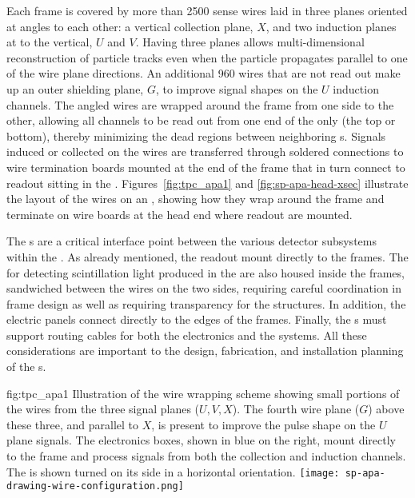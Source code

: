 Each  frame is covered by more than \num{2500} sense wires laid in three planes  oriented at angles to each other: a vertical collection plane, $X$, and two induction planes at \apainducwireangle to the vertical, $U$ and $V$. Having three planes allows multi-dimensional reconstruction of particle tracks even when the particle propagates parallel to one of the wire plane directions.  An additional \num{960} wires that are not read out make up an outer shielding plane, $G$, to improve signal shapes on the $U$ induction channels.  The angled wires are wrapped around the frame from one side to the other, allowing all channels to be read out from one end of the  only (the top or bottom), thereby minimizing the dead regions between neighboring s. Signals induced or collected on the wires are transferred through soldered connections to wire termination boards mounted at the end of the  frame that in turn connect to  readout  sitting in the .  Figures~\ref{fig:tpc_apa1} and \ref{fig:sp-apa-head-xsec} illustrate the layout of the wires on an , showing how they wrap around the frame and terminate on wire boards at the head end where readout  are mounted.

The s are a critical interface point between the various detector subsystems within the .  As already mentioned, the  readout  mount directly to the  frames.  The  for detecting scintillation light produced in the  are also housed inside the frames, sandwiched between the wires on the two sides, requiring careful coordination in frame design as well as requiring transparency for the  structures.  In addition, the electric  panels connect directly to the edges of the  frames.  Finally, the s must support routing cables for both the  electronics and the  systems. All these considerations are important to the design, fabrication, and installation planning of the s.

\begin{dunefigure}{fig:tpc_apa1}
{Illustration of the   wire wrapping scheme showing small portions of the wires from the three signal planes ($U,V,X$). The fourth wire plane ($G$) above these three, and parallel to $X$, is present to improve the pulse shape on the $U$ plane signals. The  electronics boxes, shown in blue on the right, mount directly to the frame and process signals from both the collection and induction channels. The  is shown turned on its side in a horizontal orientation.} 
\texttt{[image: sp-apa-drawing-wire-configuration.png]} 
\end{dunefigure} 

